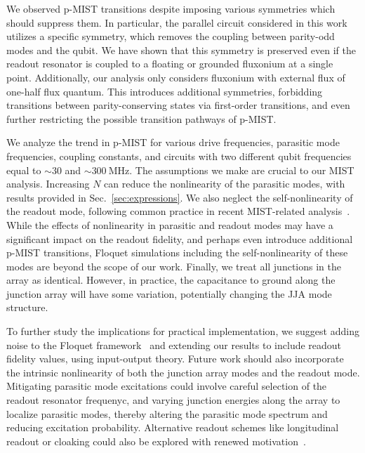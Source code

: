 \documentclass[%
reprint,
superscriptaddress,
 amsmath,amssymb,
 aps,
 prx,
longbibliography,
floatfix,
]{revtex4-2}
\begin{document}
We observed p-MIST transitions despite imposing various symmetries which should suppress them. In particular, the parallel circuit considered in this work utilizes a specific symmetry, which removes the coupling between parity-odd modes and the qubit. We have shown that this symmetry is preserved even if the readout resonator is coupled to a floating or grounded fluxonium at a single point. Additionally, our analysis only considers fluxonium with external flux of one-half flux quantum. This introduces additional symmetries, forbidding transitions between parity-conserving states via first-order transitions, and even further restricting the possible transition pathways of p-MIST.

We analyze the trend in p-MIST for various drive frequencies, parasitic mode frequencies, coupling constants, and circuits with two different qubit frequencies equal to $\sim 30$ and $\sim 300 \ \mathrm{MHz}$. The assumptions we make are crucial to our MIST analysis. Increasing $N$ can reduce the nonlinearity of the parasitic modes, with results provided in Sec.~\ref{sec:expressions}. We also neglect the self-nonlinearity of the readout mode, following common practice in recent MIST-related analysis~\cite{shillito2022dynamics,dumas2024unified,cohen2023reminiscence}. While the effects of nonlinearity in parasitic and readout modes may have a significant impact on the readout fidelity, and perhaps even introduce additional p-MIST transitions, Floquet simulations including the self-nonlinearity of these modes are beyond the scope of our work. Finally, we treat all junctions in the array as identical. However, in practice, the capacitance to ground along the junction array will have some variation, potentially changing the JJA mode structure. 


To further study the implications for practical implementation, we suggest adding noise to the Floquet framework~\cite{huang_engineering_2021} and extending our results to include readout fidelity values, using input-output theory. Future work should also incorporate the intrinsic nonlinearity of both the junction array modes and the readout mode. Mitigating parasitic mode excitations could involve careful selection of the readout resonator frequenyc, and varying junction energies along the array to localize parasitic modes, thereby altering the parasitic mode spectrum and reducing excitation probability. Alternative readout schemes like longitudinal readout or cloaking could also be explored with renewed motivation~\cite{reed_high-fidelity_2010, munoz-arias_qubit_2023, didier_fast_2015}. 
\end{document}
